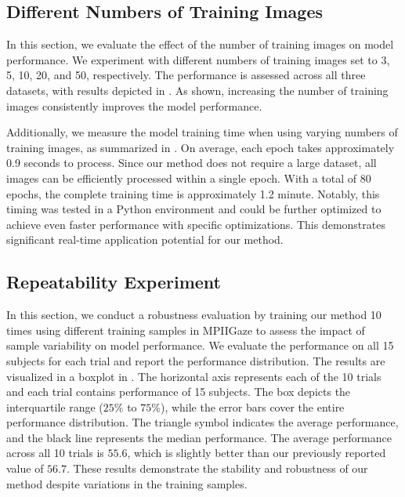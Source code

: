 \subsection{Different Numbers of Training Images }
In this section, we evaluate the effect of the number of training images on model performance. We experiment with different numbers of training images set to 3, 5, 10, 20, and 50, respectively. The performance is assessed across all three datasets, with results depicted in . As shown, increasing the number of training images consistently improves the model performance.

Additionally, we measure the model training time when using varying numbers of training images, as summarized in . On average, each epoch takes approximately 0.9 seconds to process. Since our method does not require a large dataset, all images can be efficiently processed within a single epoch. With a total of 80 epochs, the complete training time is approximately 1.2 minute. Notably, this timing was tested in a Python environment and could be further optimized to achieve even faster performance with specific optimizations. This demonstrates significant real-time application potential for our method. 


\subsection{Repeatability Experiment}
In this section, we conduct a robustness evaluation by training our method 10 times using different training samples in MPIIGaze to assess the impact of sample variability on model performance. We evaluate the performance on all 15 subjects for each trial and report the performance distribution. The results are visualized in a boxplot in .
The horizontal axis represents each of the 10 trials and each trial contains performance of 15 subjects. The box depicts the interquartile range ($25\%$ to $75\%$), while the error bars cover the entire performance distribution. The triangle symbol indicates the average performance, and the black line represents the median performance.
The average performance across all 10 trials is $55.6$, which is slightly better than our previously reported value of $56.7$. These results demonstrate the stability and robustness of our method despite variations in the training samples.


